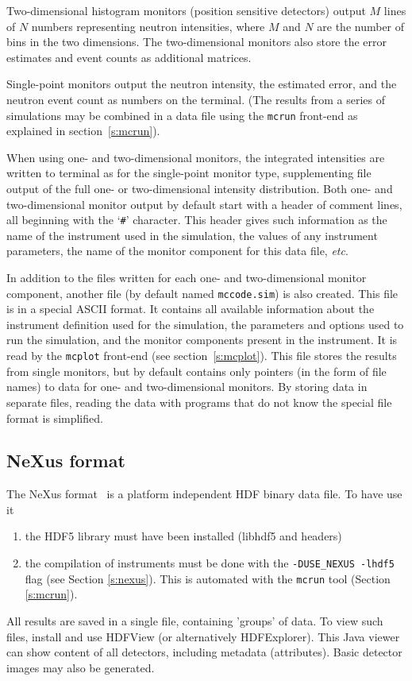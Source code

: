 Two-dimensional histogram monitors (position sensitive detectors) output $M$
lines of $N$ numbers representing neutron intensities, where $M$ and $N$ are the
number of bins in the two dimensions. The two-dimensional monitors also store
the error estimates and event counts as additional matrices.

Single-point monitors output the neutron intensity, the estimated
error, and the neutron event count as numbers on the
terminal. (The results from a series of simulations may be combined in a
data file using the \verb+mcrun+ front-end as explained in
section~\ref{s:mcrun}).

When using one- and two-dimensional monitors, the integrated intensities are
written to terminal as for the single-point monitor type, supplementing file
output of the full one- or two-dimensional intensity distribution. Both one- and
two-dimensional monitor output by default start with a header of comment lines,
all beginning with the `\verb+#+' character.  This header gives such information
as the name of the instrument used in the simulation, the values of any
instrument parameters, the name of the monitor component for this data file,
\textit{etc}.

In addition to the files written for each one- and two-dimensional monitor
component, another file (by default named \verb+mccode.sim+) is also
created. This file is in a special \MCS ASCII format. It contains all available
information about the instrument definition used for the simulation, the
parameters and options used to run the simulation, and the monitor components
present in the instrument. It is read by the \verb+mcplot+ front-end (see
section~\ref{s:mcplot}). This file stores the results from single monitors, but
by default contains only pointers (in the form of file names) to data for one-
and two-dimensional monitors. By storing data in separate files, reading the
data with programs that do not know the special \MCS file format is
simplified.

\subsection{NeXus format}
\label{r:nexus}

The NeXus format~\cite{nexus_webpage} is a platform independent HDF binary data
file. To have \MCS use it
\begin{enumerate}
\item the HDF5 library must have been installed (libhdf5 and headers)
\item the compilation of instruments must be done with the
  \verb+-DUSE_NEXUS -lhdf5+ flag (see Section \ref{s:nexus}). This is
  automated with the \verb+mcrun+ tool (Section \ref{s:mcrun}).
\end{enumerate}
All results are saved in a single file, containing 'groups' of data. To view
such files, install and use HDFView (or alternatively HDFExplorer). This Java
viewer can show content of all detectors, including metadata (attributes). Basic
detector images may also be generated.

